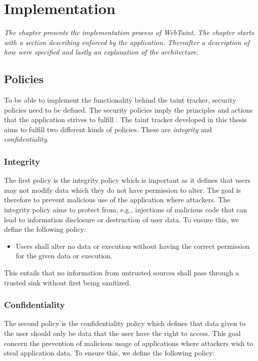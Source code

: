 \chapter{Implementation}
\label{Implementation}
\textit{The chapter presents the implementation process of WebTaint. The chapter starts with a section describing \textit{} enforced by the application. Thereafter a description of how  \textit{} were specified and lastly an explanation of the  \textit{} architecture.}



\section{Policies}
\label{Policies}
To be able to implement the functionality behind the taint tracker, security policies need to be defined. The security policies imply the principles and actions that the application strives to fulfill \parencite{BayukJenniferL2012Cspg}. The taint tracker developed in this thesis aims to fulfill two different kinds of policies. These are \textit{integrity} and \textit{confidentiality}.



\subsection{Integrity}
\label{Integrity}
The first policy is the integrity policy which is important as it defines that users may not modify data which they do not have permission to alter. The goal is therefore to prevent malicious use of the application where attackers. The integrity policy aims to protect from, e.g., injections of malicious code that can lead to information disclosure or destruction of user data. To ensure this, we define the following policy:

\hfill
\begin{itemize}
    \item Users shall alter no data or execution without having the correct permission for the given data or execution.
\end{itemize}
\hfill

This entails that no information from untrusted sources shall pass through a trusted sink without first being sanitized.



\subsection{Confidentiality}
\label{Confidentiality}
The second policy is the confidentiality policy which defines that data given to the user should only be data that the user have the right to access. This goal concern the prevention of malicious usage of applications where attackers wish to steal application data. To ensure this, we define the following policy:

